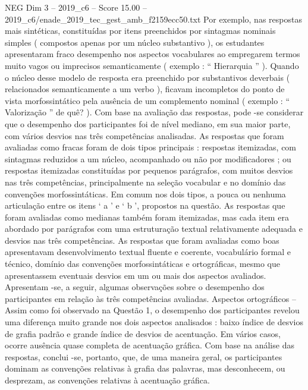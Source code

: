 \begin{textsample}{NEG Dim 3 – 2019\_c6 – Score 15.00 – 2019\_c6/enade\_2019\_tec\_gest\_amb\_f2159ecc50.txt}
Por exemplo, nas respostas mais sintéticas, constituídas por itens preenchidos por sintagmas nominais simples ( compostos apenas por um núcleo substantivo ), os estudantes apresentaram fraco desempenho nos aspectos vocabulares ao empregarem termos muito vagos ou imprecisos semanticamente ( exemplo : “ Hierarquia ” ).
Quando o núcleo desse modelo de resposta era preenchido por substantivos deverbais ( relacionados semanticamente a um verbo ), ficavam incompletos do ponto de vista morfossintático pela ausência de um complemento nominal ( exemplo : “ Valorização ” de quê? ).
Com base na avaliação das respostas, pode -se considerar que o desempenho dos participantes foi de nível mediano, em sua maior parte, com vários desvios nas três competências analisadas.
As respostas que foram avaliadas como fracas foram de dois tipos principais : respostas itemizadas, com sintagmas reduzidos a um núcleo, acompanhado ou não por modificadores ; ou respostas itemizadas constituídas por pequenos parágrafos, com muitos desvios nas três competências, principalmente na seleção vocabular e no domínio das convenções morfossintáticas.
Em comum nos dois tipos, a pouca ou nenhuma articulação entre os itens ‘ a ’ e ‘ b ’, propostos na questão.
As respostas que foram avaliadas como medianas também foram itemizadas, mas cada item era abordado por parágrafos com uma estruturação textual relativamente adequada e desvios nas três competências.
As respostas que foram avaliadas como boas apresentavam desenvolvimento textual fluente e coerente, vocabulário formal e técnico, domínio das convenções morfossintáticas e ortográficas, mesmo que apresentassem eventuais desvios em um ou mais dos aspectos avaliados.
Apresentam -se, a seguir, algumas observações sobre o desempenho dos participantes em relação às três competências avaliadas.
Aspectos ortográficos – Assim como foi observado na Questão 1, o desempenho dos participantes revelou uma diferença muito grande nos dois aspectos analisados : baixo índice de desvios de grafia padrão e grande índice de desvios de acentuação.
Em vários casos, ocorre ausência quase completa de acentuação gráfica.
Com base na análise das respostas, conclui -se, portanto, que, de uma maneira geral, os participantes dominam as convenções relativas à grafia das palavras, mas desconhecem, ou desprezam, as convenções relativas à acentuação gráfica.

\end{textsample}

